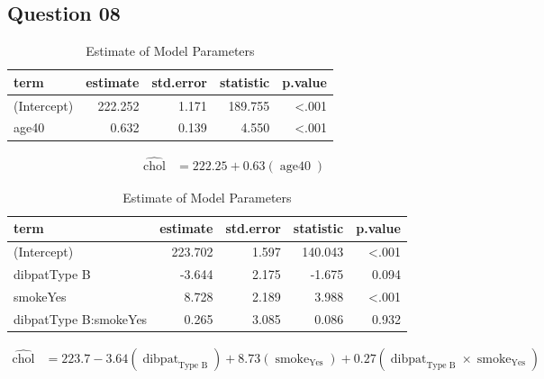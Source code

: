 \documentclass[
  12pt,
  oneside]{article}
\begin{document}
\hypertarget{question-08}{%
\subsection{Question 08}\label{question-08}}

\begin{table}[H]

\caption{\label{tab:Table-09}Estimate of Model Parameters}
\centering
\begin{tabular}[t]{lrrrr}
\toprule
term & estimate & std.error & statistic & p.value\\
\midrule
(Intercept) & 222.252 & 1.171 & 189.755 & <.001\\
age40 & 0.632 & 0.139 & 4.550 & <.001\\
\bottomrule
\end{tabular}
\end{table}

\begin{equation}
\begin{aligned}
\operatorname{\widehat{chol}} &= 222.25 + 0.63(\operatorname{age40})
\end{aligned}
\end{equation}

\begin{table}[H]

\caption{\label{tab:Table-10}Estimate of Model Parameters}
\centering
\begin{tabular}[t]{lrrrr}
\toprule
term & estimate & std.error & statistic & p.value\\
\midrule
(Intercept) & 223.702 & 1.597 & 140.043 & <.001\\
dibpatType B & -3.644 & 2.175 & -1.675 & 0.094\\
smokeYes & 8.728 & 2.189 & 3.988 & <.001\\
dibpatType B:smokeYes & 0.265 & 3.085 & 0.086 & 0.932\\
\bottomrule
\end{tabular}
\end{table}

\begin{equation}
\begin{aligned}
\operatorname{\widehat{chol}} &= 223.7 - 3.64(\operatorname{dibpat}_{\operatorname{Type\ B}}) + 8.73(\operatorname{smoke}_{\operatorname{Yes}}) + 0.27(\operatorname{dibpat}_{\operatorname{Type\ B}} \times \operatorname{smoke}_{\operatorname{Yes}})
\end{aligned}
\end{equation}
\end{document}
